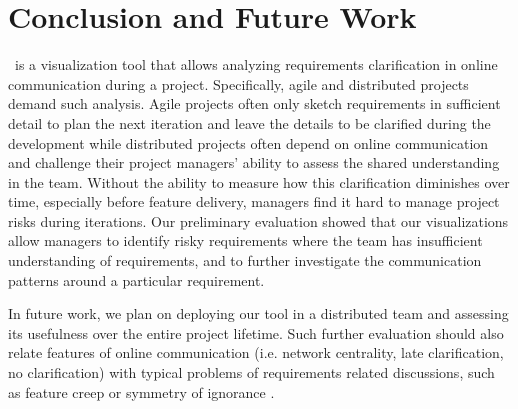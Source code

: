 \section{Conclusion and Future Work}
 \viss\ is a visualization tool that allows analyzing requirements clarification in online communication during a project.
Specifically, agile and distributed projects demand such analysis.
Agile projects often only sketch requirements in sufficient detail to plan the next iteration and leave the details to be clarified during the development while distributed projects often depend on online communication and challenge their project managers' ability to assess the shared understanding in the team. 
Without the ability to measure how this clarification diminishes over time, especially before feature delivery, managers find it hard to manage project risks during iterations.
Our preliminary evaluation showed that our visualizations allow managers to identify risky requirements where the team has insufficient understanding of requirements, and to further investigate the communication patterns around a particular requirement. %
 
In future work, we plan on deploying our tool in a distributed team and assessing its usefulness over the entire project lifetime. 
Such further evaluation should also relate features of online communication (i.e. network centrality, late clarification, no clarification) with typical problems of requirements related discussions, such as feature creep \cite{Jones1996} or symmetry of ignorance \cite{Fischer2000}.




